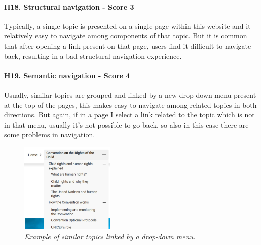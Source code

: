 \paragraph{H18. Structural navigation - Score 3}	Typically, a single topic is presented on a single page within this website and it relatively easy to navigate among components of that topic. But it is common that after opening a link present on that page, users find it difficult to navigate back, resulting in a bad structural navigation experience.
\newline
\paragraph{H19. Semantic navigation - Score 4}	Usually, similar topics are grouped and linked by a new drop-down menu present at the top of the pages, this makes easy to navigate among related topics in both directions.
\newline But again, if in a page I select a link related to the topic which is not in that menu, usually it’s not possible to go back, so also in this case there are some problems in navigation.
\begin{figure}[!h]
	\begin{center}
		\includegraphics[width=0.4\textwidth]{Picture12.jpg}
		\captionsetup{font=small}
		\caption{\textit{Example of similar topics linked by a drop-down menu.}}
	\end{center}
\end{figure}
\newline
